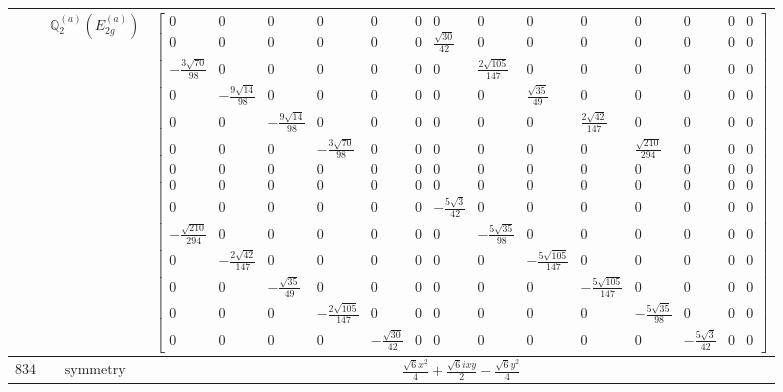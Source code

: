 \documentclass[fleqn,8pt,landscape]{jsarticle}
\begin{document}
\begin{longtable}{ccc}
$  $ & $ \mathbb{Q}_{2}^{(a)}(E_{2g}^{(a)}) $ & $ \begin{bmatrix} 0 & 0 & 0 & 0 & 0 & 0 & 0 & 0 & 0 & 0 & 0 & 0 & 0 & 0 \\ 0 & 0 & 0 & 0 & 0 & 0 & \frac{\sqrt{30}}{42} & 0 & 0 & 0 & 0 & 0 & 0 & 0 \\ - \frac{3 \sqrt{70}}{98} & 0 & 0 & 0 & 0 & 0 & 0 & \frac{2 \sqrt{105}}{147} & 0 & 0 & 0 & 0 & 0 & 0 \\ 0 & - \frac{9 \sqrt{14}}{98} & 0 & 0 & 0 & 0 & 0 & 0 & \frac{\sqrt{35}}{49} & 0 & 0 & 0 & 0 & 0 \\ 0 & 0 & - \frac{9 \sqrt{14}}{98} & 0 & 0 & 0 & 0 & 0 & 0 & \frac{2 \sqrt{42}}{147} & 0 & 0 & 0 & 0 \\ 0 & 0 & 0 & - \frac{3 \sqrt{70}}{98} & 0 & 0 & 0 & 0 & 0 & 0 & \frac{\sqrt{210}}{294} & 0 & 0 & 0 \\ 0 & 0 & 0 & 0 & 0 & 0 & 0 & 0 & 0 & 0 & 0 & 0 & 0 & 0 \\ 0 & 0 & 0 & 0 & 0 & 0 & 0 & 0 & 0 & 0 & 0 & 0 & 0 & 0 \\ 0 & 0 & 0 & 0 & 0 & 0 & - \frac{5 \sqrt{3}}{42} & 0 & 0 & 0 & 0 & 0 & 0 & 0 \\ - \frac{\sqrt{210}}{294} & 0 & 0 & 0 & 0 & 0 & 0 & - \frac{5 \sqrt{35}}{98} & 0 & 0 & 0 & 0 & 0 & 0 \\ 0 & - \frac{2 \sqrt{42}}{147} & 0 & 0 & 0 & 0 & 0 & 0 & - \frac{5 \sqrt{105}}{147} & 0 & 0 & 0 & 0 & 0 \\ 0 & 0 & - \frac{\sqrt{35}}{49} & 0 & 0 & 0 & 0 & 0 & 0 & - \frac{5 \sqrt{105}}{147} & 0 & 0 & 0 & 0 \\ 0 & 0 & 0 & - \frac{2 \sqrt{105}}{147} & 0 & 0 & 0 & 0 & 0 & 0 & - \frac{5 \sqrt{35}}{98} & 0 & 0 & 0 \\ 0 & 0 & 0 & 0 & - \frac{\sqrt{30}}{42} & 0 & 0 & 0 & 0 & 0 & 0 & - \frac{5 \sqrt{3}}{42} & 0 & 0 \end{bmatrix} $ \\ \hline
$ 834 $ & $ \text{symmetry} $ & $ \frac{\sqrt{6} x^{2}}{4} + \frac{\sqrt{6} i x y}{2} - \frac{\sqrt{6} y^{2}}{4} $ \\

\end{longtable}
\end{document}
